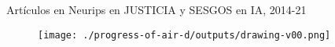 %
%
%
%
%

%
%
%
%

{

\begin{frame}{
Art\'iculos en Neurips en JUSTICIA y SESGOS en IA, 2014-21  
}

\begin{figure}
 \centering
 \texttt{[image: ./progress-of-air-d/outputs/drawing-v00.png]}
\end{figure}

\end{frame}
}


